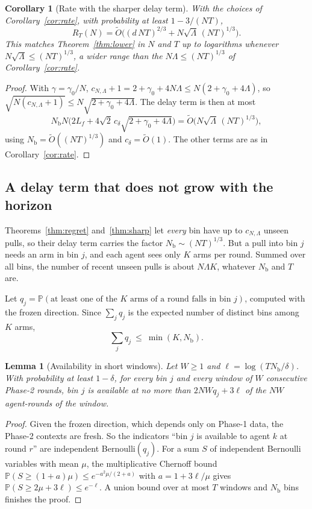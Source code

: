 \documentclass[11pt]{article}
\newtheorem{lemma}[theorem]{Lemma}
\newtheorem{corollary}[theorem]{Corollary}
\theoremstyle{definition}
\newcommand{\Prob}{\mathbb{P}}
\newcommand{\Nb}{N_{\mathrm b}}
\begin{document}
\begin{corollary}[Rate with the sharper delay term]\label{cor:sharp}
With the choices of Corollary~\ref{cor:rate}, with probability at least $1-3/(NT)$,
\[
R_T(N)=\tilde O\Big((d\,NT)^{2/3}+N\sqrt{\Lambda}\,(NT)^{1/3}\Big).
\]
This matches Theorem~\ref{thm:lower} in $N$ and $T$ up to logarithms whenever $N\sqrt\Lambda\le(NT)^{1/3}$, a wider range
than the $N\Lambda\le(NT)^{1/3}$ of Corollary~\ref{cor:rate}.
\end{corollary}
\begin{proof}
With $\gamma=\gamma_0/N$, $c_{N,\Lambda}+1=2+\gamma_0+4N\Lambda\le N(2+\gamma_0+4\Lambda)$, so
$\sqrt{N(c_{N,\Lambda}+1)}\le N\sqrt{2+\gamma_0+4\Lambda}$. The delay term is then at most
\[
\Nb N\big(2L_f+4\sqrt2\,c_\delta\sqrt{2+\gamma_0+4\Lambda}\big)=\tilde O\big(N\sqrt\Lambda\,(NT)^{1/3}\big),
\]
using
$\Nb=\tilde O((NT)^{1/3})$ and $c_\delta=\tilde O(1)$. The other terms are as in Corollary~\ref{cor:rate}.
\end{proof}

\subsection{A delay term that does not grow with the horizon}

Theorems~\ref{thm:regret} and~\ref{thm:sharp} let \emph{every} bin have up to $c_{N,\Lambda}$ unseen pulls, so their delay
term carries the factor $\Nb\sim(NT)^{1/3}$. But a pull into bin $j$ needs an arm in bin $j$, and each agent sees only $K$
arms per round. Summed over all bins, the number of recent unseen pulls is about $N\Lambda K$, whatever $\Nb$ and $T$ are.

Let $q_j=\Prob(\text{at least one of the }K\text{ arms of a round falls in bin }j)$, computed with the frozen direction.
Since $\sum_jq_j$ is the expected number of distinct bins among $K$ arms,
\[
\textstyle\sum_jq_j\ \le\ \min(K,\Nb).
\]

\begin{lemma}[Availability in short windows]\label{lem:avail}
Let $W\ge1$ and $\ell=\log(T\Nb/\delta)$. With probability at least $1-\delta$, for every bin $j$ and every window of $W$
consecutive Phase-2 rounds, bin $j$ is available at no more than $2NWq_j+3\ell$ of the $NW$ agent-rounds of the window.
\end{lemma}
\begin{proof}
Given the frozen direction, which depends only on Phase-1 data, the Phase-2 contexts are fresh. So the indicators ``bin
$j$ is available to agent $k$ at round $r$'' are independent Bernoulli$(q_j)$. For a sum $S$ of independent Bernoulli
variables with mean $\mu$, the multiplicative Chernoff bound $\Prob(S\ge(1+a)\mu)\le e^{-a^2\mu/(2+a)}$ with
$a=1+3\ell/\mu$ gives $\Prob(S\ge2\mu+3\ell)\le e^{-\ell}$. A union bound over at most $T$ windows and $\Nb$ bins
finishes the proof.
\end{proof}
\end{document}

